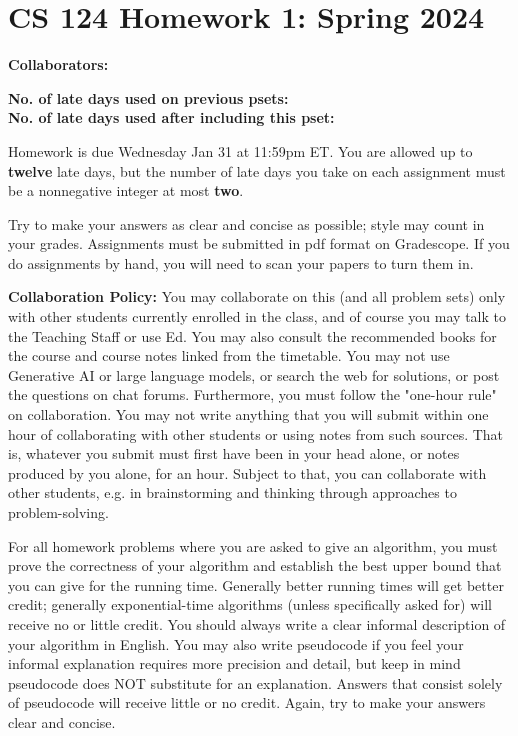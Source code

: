 \documentclass[11pt]{article}
\begin{document}


        \section*{CS 124 Homework 1: Spring 2024}


        \textbf{Collaborators: }

        \textbf{No. of late days used on previous psets: }\\
        \textbf{No. of late days used after including this pset: }

Homework is due {\color{blue} Wednesday Jan 31 at 11:59pm ET}. You are allowed up to {\bf twelve} late days, but the number of late days you take on each assignment must be a nonnegative integer at most {\bf two}.

Try to make your answers as clear and concise as possible;
style may count in your grades. Assignments must be submitted in pdf format on Gradescope. If you do assignments by hand, you will need to scan your papers to turn them in.


{\bf Collaboration Policy:} You may collaborate on this (and all problem sets) only with other students currently enrolled in the class, and of course you may talk to the Teaching Staff or use Ed. You may also consult the recommended books for the course and course notes linked from the timetable. You may not use Generative AI or large language models, or search the web for solutions, or post the questions on chat forums. Furthermore, you must follow the "one-hour rule" on collaboration.  You may not write anything that you will submit within one hour of collaborating with other students or using notes from such sources. That is, whatever you submit must first have been in your head alone, or notes produced by you alone, for an hour. Subject to that, you can collaborate with other students, e.g. in brainstorming and thinking through approaches to problem-solving.


For all homework problems where you are asked to give an algorithm, you must prove the correctness
of your algorithm and establish the best upper bound that you can give for the running time. Generally
better running times will get better credit; generally exponential-time algorithms (unless specifically asked
for) will receive no or little credit. You should always write a clear informal description of your algorithm
in English. You may also write pseudocode if you feel your informal explanation requires more precision
and detail, but keep in mind pseudocode does NOT substitute for an explanation. Answers that consist
solely of pseudocode will receive little or no credit. Again, try to make your answers clear and concise.
\end{document}
